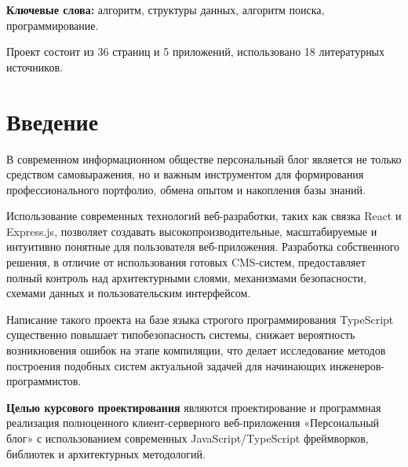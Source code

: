 \documentclass[a4paper,14pt]{extarticle}
\begin{document}
\textbf{Ключевые слова:} алгоритм, структуры данных, алгоритм поиска, программирование.

Проект состоит из 36 страниц и 5 приложений, использовано 18 литературных источников.

\newpage
\tableofcontents

\newpage
\section*{Введение}
В современном информационном обществе персональный блог является не только средством самовыражения, но и важным инструментом для формирования профессионального портфолио, обмена опытом и накопления базы знаний. 

Использование современных технологий веб-разработки, таких как связка React и Express.js, позволяет создавать высокопроизводительные, масштабируемые и интуитивно понятные для пользователя веб-приложения. Разработка собственного решения, в отличие от использования готовых CMS-систем, предоставляет полный контроль над архитектурными слоями, механизмами безопасности, схемами данных и пользовательским интерфейсом. 

Написание такого проекта на базе языка строгого программирования TypeScript существенно повышает типобезопасность системы, снижает вероятность возникновения ошибок на этапе компиляции, что делает исследование методов построения подобных систем актуальной задачей для начинающих инженеров-программистов.

\textbf{Целью курсового проектирования} являются проектирование и программная реализация полноценного клиент-серверного веб-приложения «Персональный блог» с использованием современных JavaScript/TypeScript фреймворков, библиотек и архитектурных методологий.
\end{document}
